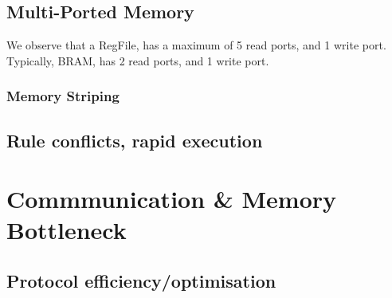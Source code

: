 \documentclass[a4paper,9pt]{report}
\begin{document}
% 

\subsection{Multi-Ported Memory}

We observe that a RegFile, has a maximum of 5 read ports, and 1 write port.
Typically, BRAM, has 2 read ports, and 1 write port.


\subsubsection{Memory Striping}

\subsection{Rule conflicts, rapid execution}


\section{Commmunication \& Memory Bottleneck}
\subsection{Protocol efficiency/optimisation}

\end{document}
